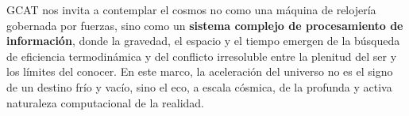 \documentclass[12pt, a4paper]{article}
\begin{document}
GCAT nos invita a contemplar el cosmos no como una máquina de relojería gobernada por fuerzas, sino como un \textbf{sistema complejo de procesamiento de información}, donde la gravedad, el espacio y el tiempo emergen de la búsqueda de eficiencia termodinámica y del conflicto irresoluble entre la plenitud del ser y los límites del conocer. En este marco, la aceleración del universo no es el signo de un destino frío y vacío, sino el eco, a escala cósmica, de la profunda y activa naturaleza computacional de la realidad.
\end{document}
